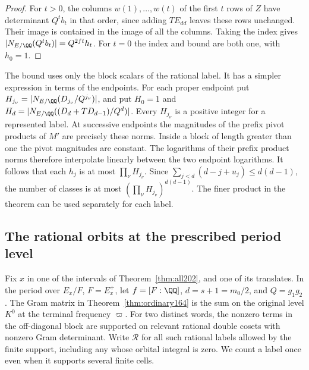 \documentclass[a4paper,11pt]{article}
\theoremstyle{definition}
\theoremstyle{remark}
\numberwithin{equation}{section}
\begin{document}
\begin{proof}
For \(t>0\), the columns \(w(1),\ldots,w(t)\) of the first
\(t\) rows of \(Z\) have determinant \(Q^t b_t\) in that
order, since adding \(TE_{dd}\) leaves these rows unchanged.
Their image is contained in the image of all the columns.
Taking the index gives \(|N_{E/\QQ}(Q^t b_t)|=Q^{2ft}h_t\).
For \(t=0\) the index and bound are both one, with \(h_0=1\).
\end{proof}

The bound uses only the block scalars of the rational label.
It has a simpler expression in terms of the endpoints. For
each proper endpoint put \(H_{j_\nu}=|N_{E/\QQ}(D_{j_\nu}/Q^{j_\nu})|\),
and put \(H_0=1\) and
\(H_d=|N_{E/\QQ}((D_d+TD_{d-1})/Q^d)|\).
Every \(H_{j_\nu}\) is a positive integer for a represented
label. At successive endpoints the magnitudes of the prefix
pivot products of \(M'\) are precisely these norms.
Inside a block of length greater than one the pivot magnitudes
are constant. The logarithms of their prefix product norms
therefore interpolate linearly between the two endpoint
logarithms. It follows that each \(h_j\) is at most
\(\prod_\nu H_{j_\nu}\). Since
\(\sum_{j<d}(d-j+u_j)\le d(d-1)\), the number of classes is
at most \((\prod_\nu H_{j_\nu})^{d(d-1)}\).
The finer product in the theorem can be used separately for
each label.

\subsection{The rational orbits at the prescribed period level}\label{nav:VIII-29}
Fix \(x\) in one of the intervals of Theorem~\ref{thm:all202}, and
one of its translates. In the period over \(E_x/F\), \(F=E_x^+\),
let \(f=[F:\QQ]\), \(d=s+1=m_0/2\), and \(Q=g_1g_2\).
The Gram matrix in Theorem~\ref{thm:ordinary164} is the sum on the
original level \(K^0\) at the terminal frequency \(\varpi\).
For two distinct words, the nonzero terms in the off-diagonal block
are supported on relevant rational double cosets with nonzero Gram
determinant. Write \(\mathcal R\) for all such rational labels allowed
by the finite support, including any whose orbital integral is zero.
We count a label once even when it supports several finite cells.
\end{document}

